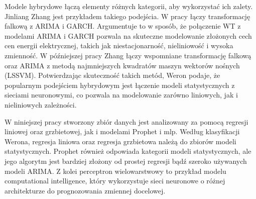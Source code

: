 Modele hybrydowe łączą elementy różnych kategorii, aby wykorzystać ich zalety. Jinliang Zhang jest przykładem takiego podejścia. W pracy \cite{TAN20103606} łączy transformację falkową z ARIMA i GARCH. Argumentuje to w sposób, że połączenie WT z modelami ARIMA i GARCH pozwala na skuteczne modelowanie złożonych cech cen energii elektrycznej, takich jak niestacjonarność, nieliniowość i wysoka zmienność. W późniejszej pracy Zhang \cite{ZHANG2012695} łączy wspomniane transformację falkową oraz ARIMA z metodą najmniejszych kwadratów maszyn wektorów nośnych (LSSVM). Potwierdzając skuteczność takich metód, Weron \cite{WERON20141030} podaje, że popularnym podejściem hybrydowym jest łączenie modeli statystycznych z sieciami neuronowymi, co pozwala na modelowanie zarówno liniowych, jak i nieliniowych zależności.

W niniejszej pracy stworzony zbiór danych jest analizowany za pomocą regresji liniowej oraz grzbietowej, jak i modelami Prophet i \gls{mlp}. Według klasyfikacji Werona, regresja liniowa oraz regresja grzbietowa należą do zbiorów modeli statystycznych. Prophet również odpowiada kategorii modeli statystycznych, ale jego algorytm jest bardziej złożony od prostej regresji bądź szeroko używanych modeli ARIMA. Z kolei perceptron wielowarstwowy to przykład modelu computational intelligence, który wykorzystuje sieci neuronowe o różnej architekturze do prognozowania zmiennej docelowej.
